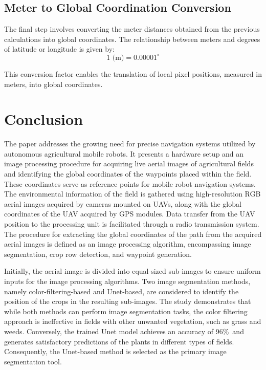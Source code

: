 \documentclass[conference]{IEEEtran}
\begin{document}
\subsection{Meter to Global Coordination Conversion}\label{Meter to Global Coordination Conversion}
The final step involves converting the meter distances obtained from the previous calculations into global coordinates. The relationship between meters and degrees of latitude or longitude is given by:
\[
1 \text{ (m)} = 0.00001^\circ
\]

This conversion factor enables the translation of local pixel positions, measured in meters, into global coordinates.

\section{Conclusion}\label{Conclusion}
The paper addresses the growing need for precise navigation systems utilized by autonomous agricultural mobile robots. It presents a hardware setup and an image processing procedure for acquiring live aerial images of agricultural fields and identifying the global coordinates of the waypoints placed within the field. These coordinates serve as reference points for mobile robot navigation systems. The environmental information of the field is gathered using high-resolution RGB aerial images acquired by cameras mounted on UAVs, along with the global coordinates of the UAV acquired by GPS modules. Data transfer from the UAV position to the processing unit is facilitated through a radio transmission system. The procedure for extracting the global coordinates of the path from the acquired aerial images is defined as an image processing algorithm, encompassing image segmentation, crop row detection, and waypoint generation.

Initially, the aerial image is divided into equal-sized sub-images to ensure uniform inputs for the image processing algorithms. Two image segmentation methods, namely color-filtering-based and Unet-based, are considered to identify the position of the crops in the resulting sub-images. The study demonstrates that while both methods can perform image segmentation tasks, the color filtering approach is ineffective in fields with other unwanted vegetation, such as grass and weeds. Conversely, the trained Unet model achieves an accuracy of 96\%\ and generates satisfactory predictions of the plants in different types of fields. Consequently, the Unet-based method is selected as the primary image segmentation tool.
\end{document}
